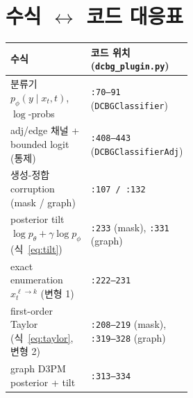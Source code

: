 \documentclass[11pt]{article}
\newcommand{\code}[1]{\texttt{\small #1}}
\newcommand{\pth}{p_\theta}
\newcommand{\pphi}{p_\phi}
\theoremstyle{plain}
\theoremstyle{definition}
\begin{document}
\section{수식 $\leftrightarrow$ 코드 대응표}
\begin{center}
\renewcommand{\arraystretch}{1.2}
\begin{tabular}{@{}p{0.52\linewidth} l@{}}
\toprule
\textbf{수식} & \textbf{코드 위치 (\code{dcbg\_plugin.py})}\\
\midrule
분류기 $\pphi(y\mid x_t,t)$, $\log$-probs & \code{:70--91} (\code{DCBGClassifier})\\
adj/edge 채널 + bounded logit (통제) & \code{:408--443} (\code{DCBGClassifierAdj})\\
생성-정합 corruption (mask / graph) & \code{:107 / :132}\\
posterior tilt $\log\pth+\gamma\log\pphi$ (식~\ref{eq:tilt}) & \code{:233} (mask), \code{:331} (graph)\\
exact enumeration $x_t^{\ell\to k}$ (변형 1) & \code{:222--231}\\
first-order Taylor (식~\ref{eq:taylor}, 변형 2) & \code{:208--219} (mask), \code{:319--328} (graph)\\
graph D3PM posterior + tilt & \code{:313--334}\\
\bottomrule
\end{tabular}
\end{center}
\end{document}
